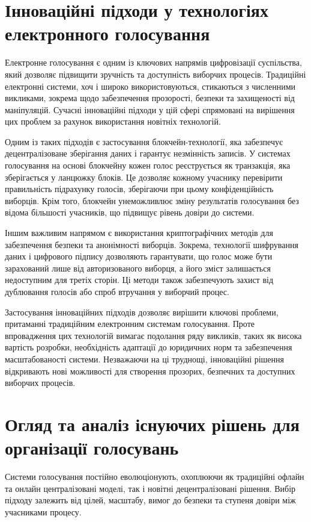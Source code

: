 \documentclass[14pt]{extreport}
\begin{document}
  \section{Інноваційні підходи у технологіях електронного голосування}
  
    Електронне голосування є одним із ключових напрямів цифровізації суспільства, який дозволяє підвищити зручність та доступність виборчих процесів. Традиційні електронні системи, хоч і широко використовуються, стикаються з численними викликами, зокрема щодо забезпечення прозорості, безпеки та захищеності від маніпуляцій. Сучасні інноваційні підходи у цій сфері спрямовані на вирішення цих проблем за рахунок використання новітніх технологій.

  Одним із таких підходів є застосування блокчейн-технології, яка забезпечує децентралізоване зберігання даних і гарантує незмінність записів. У системах голосування на основі блокчейну кожен голос реєструється як транзакція, яка зберігається у ланцюжку блоків. Це дозволяє кожному учаснику перевірити правильність підрахунку голосів, зберігаючи при цьому конфіденційність виборців. Крім того, блокчейн унеможливлює зміну результатів голосування без відома більшості учасників, що підвищує рівень довіри до системи.

  Іншим важливим напрямом є використання криптографічних методів для забезпечення безпеки та анонімності виборців. Зокрема, технології шифрування даних і цифрового підпису дозволяють гарантувати, що голос може бути зарахований лише від авторизованого виборця, а його зміст залишається недоступним для третіх сторін. Ці методи також забезпечують захист від дублювання голосів або спроб втручання у виборчий процес.

  Застосування інноваційних підходів дозволяє вирішити ключові проблеми, притаманні традиційним електронним системам голосування. Проте впровадження цих технологій вимагає подолання ряду викликів, таких як висока вартість розробки, необхідність адаптації до юридичних норм та забезпечення масштабованості системи. Незважаючи на ці труднощі, інноваційні рішення відкривають нові можливості для створення прозорих, безпечних та доступних виборчих процесів.
  
  \section{Огляд та аналіз існуючих рішень для організації голосувань}

  Системи голосування постійно еволюціонують, охоплюючи як традиційні оф\-лайн та онлайн централізовані моделі, так і новітні децентралізовані рішення. Вибір підходу залежить від цілей, масштабу, вимог до безпеки та ступеня довіри між учасниками процесу.
\end{document}
